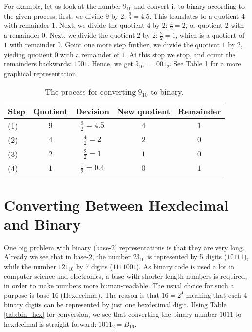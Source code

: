For example, let us look at the number $9_{10}$ and convert it to binary according to the given process: first, we divide $9$ by $2$: $\frac{9}{2}=4.5$. This translates to a quotient $4$ with remainder $1$. Next, we divide the quotient $4$ by $2$: $\frac{4}{2}=2$, or quotient $2$ with a remainder $0$. Next, we divide the quotient $2$ by $2$: $\frac{2}{2}=1$, which is a quotient of $1$ with remainder $0$. Goint one more step further, we divide the quotient $1$ by $2$, yieding quotient $0$ with a remainder of $1$. At this stop we stop, and count the remainders backwards: $1001$. Hence, we get $9_{10}=1001_{2}$. See Table \ref{tab:convert_9_bin} for a more graphical representation. \par
        
\begin{table}
  \centering
  \caption{The process for converting $9_{10}$ to binary.}
  \label{tab:convert_9_bin}
  \setlength{\extrarowheight}{10pt}
  \begin{tabular}[]{ l c c c c }
    Step & Quotient & Devision & New quotient & Remainder \\
    \hline
    (1) & $9$ & $\frac{9}{2}=4.5$  & $4$ & $1$ \\
    (2) & $4$ & $\frac{4}{2}=2  $  & $2$ & $0$ \\
    (3) & $2$ & $\frac{2}{2}=1  $  & $1$ & $0$ \\
    (4) & $1$ & $\frac{1}{2}=0.4$  & $0$ & $1$ \\
    \hline
  \end{tabular}
\end{table}

\section{Converting Between Hexdecimal and Binary}
One big problem with binary (base-$2$) representations is that they are very long. Already we see that in base-$2$, the number $23_{10}$ is represented by 5 digits ($10111$), while the number $121_{10}$ by 7 digits ($1111001$). As binary code is used a lot in computer science and electronics, a base with shorter-length numbers is required, in order to make numbers more human-readable. The usual choice for such a purpose is base-$16$ (Hexdecimal). The reason is that $16=2^{4}$ meaning that each $4$ binary digits can be represented by just one hexdecimal digit. Using Table \ref{tab:bin_hex} for conversion, we see that converting the binary number $1011$ to hexdecimal is straight-forward: $1011_{2}=B_{16}$. \par

